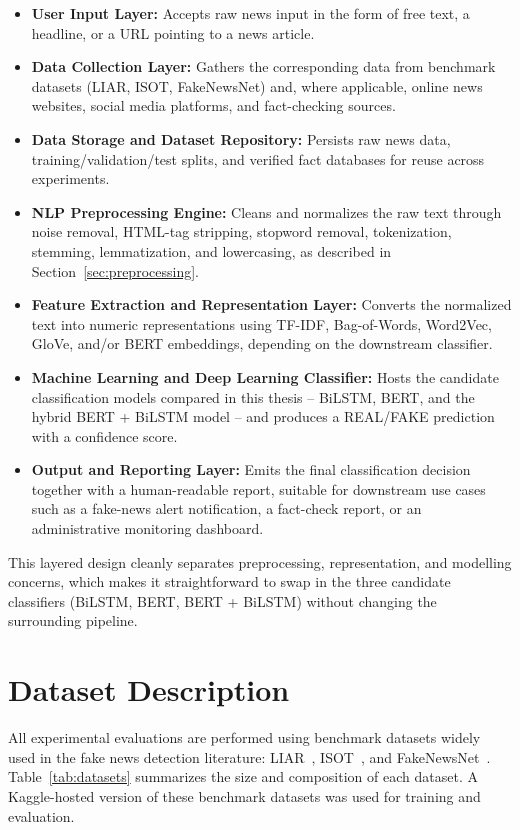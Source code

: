 \begin{itemize}
\item \textbf{User Input Layer:} Accepts raw news input in the form of free text, a headline, or a URL pointing to a news article.
\item \textbf{Data Collection Layer:} Gathers the corresponding data from benchmark datasets (LIAR, ISOT, FakeNewsNet) and, where applicable, online news websites, social media platforms, and fact-checking sources.
\item \textbf{Data Storage and Dataset Repository:} Persists raw news data, training/validation/test splits, and verified fact databases for reuse across experiments.
\item \textbf{NLP Preprocessing Engine:} Cleans and normalizes the raw text through noise removal, HTML-tag stripping, stopword removal, tokenization, stemming, lemmatization, and lowercasing, as described in Section~\ref{sec:preprocessing}.
\item \textbf{Feature Extraction and Representation Layer:} Converts the normalized text into numeric representations using TF-IDF, Bag-of-Words, Word2Vec, GloVe, and/or BERT embeddings, depending on the downstream classifier.
\item \textbf{Machine Learning and Deep Learning Classifier:} Hosts the candidate classification models compared in this thesis -- BiLSTM, BERT, and the hybrid BERT + BiLSTM model -- and produces a REAL/FAKE prediction with a confidence score.
\item \textbf{Output and Reporting Layer:} Emits the final classification decision together with a human-readable report, suitable for downstream use cases such as a fake-news alert notification, a fact-check report, or an administrative monitoring dashboard.
\end{itemize}

This layered design cleanly separates preprocessing, representation, and modelling concerns, which makes it straightforward to swap in the three candidate classifiers (BiLSTM, BERT, BERT + BiLSTM) without changing the surrounding pipeline.

\section{Dataset Description}

All experimental evaluations are performed using benchmark datasets widely used in the fake news detection literature: LIAR~\citep{Wang2017Liar}, ISOT~\citep{ISOTDataset}, and FakeNewsNet~\citep{Shu2020FakeNewsNet}. Table~\ref{tab:datasets} summarizes the size and composition of each dataset. A Kaggle-hosted version of these benchmark datasets was used for training and evaluation.

